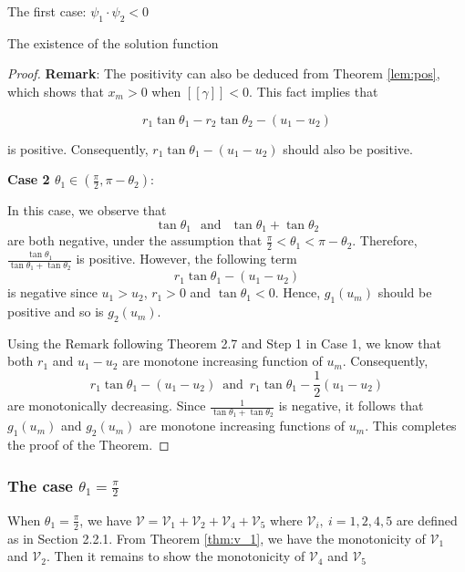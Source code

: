 \documentclass[letterpaper,reqno,10pt,twoside]{amsart}
\theoremstyle{definition}
\theoremstyle{remark}
\begin{document}
\begin{section}{The first case: $\psi_1\cdot \psi_2<0$ }
\begin{subsection}{The existence of the solution function}
\begin{proof}
  \textbf{Remark}: The positivity can also be deduced from Theorem \ref{lem:pos}, which shows that $x_{m}>0$ when $[\![\gamma]\!]<0$. This fact implies that

  \begin{equation*}
      r_1\tan\theta_1-r_2\tan\theta_2-(u_1-u_2)
  \end{equation*}

  \noindent is positive. Consequently, $r_1\tan\theta_1-(u_1-u_2)$ should also be positive.
  
  \textbf{Case 2 $\theta_1\in (\frac{\pi}{2},\pi-\theta_2)$}:
  
  In this case, we observe that 
  \begin{equation*}
  \tan\theta_1 ~~\operatorname{and}~~ \tan\theta_1+\tan\theta_2
  \end{equation*}
  are both negative, under the assumption that $\frac{\pi}{2}<\theta_1<\pi-\theta_2$. Therefore, $\frac{\tan\theta_1}{\tan\theta_1+\tan\theta_2}$ is positive. However, the following term
  \begin{equation*}
  r_1\tan\theta_1-(u_1-u_2)
  \end{equation*}
  is negative since $u_1>u_2$, $r_1>0$ and $\tan\theta_1<0$. Hence, $g_1(u_m)$ should be positive and so is $g_{2}(u_m)$. 
  
   Using the Remark following Theorem 2.7 and Step 1 in Case 1, we know that both $r_1$ and $u_1-u_2$ are monotone increasing function of $u_m$. Consequently, 
   \begin{equation*}
   r_1\tan\theta_1-(u_1-u_2) ~\operatorname{and}~ r_1\tan\theta_1-\frac{1}{2}(u_1-u_2)
   \end{equation*}
   are monotonically decreasing. Since $\frac{1}{\tan\theta_1+\tan\theta_2}$ is negative, it follows that $g_1(u_m)$ and $g_{2}(u_m)$ are monotone increasing functions of $u_{m}$. This completes the proof of the Theorem.
  \end{proof}

  \subsubsection{ \textbf{The case $\theta_1=\frac{\pi}{2}$}}
  
  When $\theta_1=\frac{\pi}{2}$, we have $\mathscr{V}=\mathscr{V}_1+\mathscr{V}_2+\mathscr{V}_4+\mathscr{V}_5$ where $\mathscr{V}_{i}, ~i=1,2,4,5$ are defined as in Section 2.2.1. From Theorem \ref{thm:v_1}, we have the monotonicity of $\mathscr{V}_1$ and $\mathscr{V}_2$. Then it remains to show the monotonicity of $\mathscr{V}_{4}$ and $\mathscr{V}_{5}$


\end{subsection}
\end{section}
\end{document}
